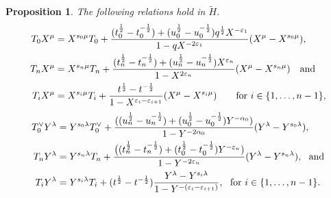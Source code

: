 \documentclass[11pt]{article}
\theoremstyle{plain}
\newtheorem{prop}[thm]{Proposition}
\theoremstyle{definition}
\theoremstyle{remark}
\numberwithin{equation}{section}
\newcounter{r}
\newcounter{s}
\begin{document}
\begin{prop} The following relations hold in $\widetilde{H}$.
\begin{align}
T_0X^\mu 
&= X^{s_0\mu}T_0 + 
\frac{ (t_0^{\frac12}-t_0^{-\frac12})+(u_0^{\frac12}-u_0^{-\frac12})q^{\frac12}X^{-\varepsilon_1} 
}{1-qX^{-2\varepsilon_1}}(X^{\mu}-X^{s_0\mu}),
\nonumber \\
T_nX^\mu 
&= X^{s_n\mu}T_n + 
\frac{ (t_n^{\frac12}-t_n^{-\frac12})+(u_n^{\frac12}-u_n^{-\frac12})X^{\varepsilon_n}
}{1-X^{2\varepsilon_n}}(X^{\mu}-X^{s_n\mu}) \quad\hbox{and}
\label{DAHATXI} 
\\
T_i X^\mu 
&= X^{s_i\mu}T_i + \frac{t^{\frac12}-t^{-\frac12}}{1-X^{\varepsilon_i-\varepsilon_{i+1}} }
(X^\mu - X^{s_i\mu})
\qquad\hbox{for $i\in \{1, \ldots, n-1\}$,}
\nonumber
\end{align}
\begin{align}
T_0^{\vee} Y^{\lambda}
&= Y^{s_0 \lambda}T_0^{\vee} + \frac{
((u_n^{\frac12}- u_n^{-\frac12})+(u_0^{\frac12}-u_0^{-\frac12})Y^{-\alpha_0})
}{ 1- Y^{-2\alpha_0} }
(Y^{\lambda}-Y^{s_0 \lambda}),
\nonumber \\
T_nY^{\lambda} &= Y^{s_n\lambda}T_n + 
\frac{\big((t_n^{\frac12}-t_n^{-\frac12})+(t_0^{\frac12}-t_0^{-\frac12})Y^{-\varepsilon_n})}
{1-Y^{-2\varepsilon_n}}(Y^{\lambda}-Y^{s_n\lambda}),
\ \ \hbox{and}
\label{DAHATYI} 
\\
T_iY^{\lambda} &= Y^{s_i\lambda}T_i + (t^{\frac12}-t^{-\frac12})
\frac{Y^{\lambda}-Y^{s_i\lambda}}
{1-Y^{-(\varepsilon_i-\varepsilon_{i+1})}},
\ \ \hbox{for $i\in \{1,\ldots, n-1\}$.}
\nonumber
\end{align}
\end{prop}
\end{document}
